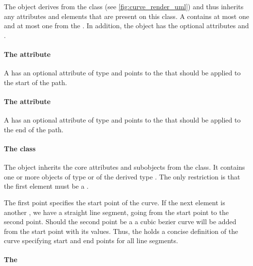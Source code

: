 The \RenderCurve object derives from the \GraphicalPrimitiveOneD class (see \ref{fig:curve_render_uml})
and thus inherits any attributes and elements that are present on this
class.
A \RenderCurve contains at most one \ListOfElements and at most one  from the \LayoutPackage.
In addition, the \RenderCurve object has the optional attributes  and .

\paragraph{The \fixttspace{} attribute}

A \RenderCurve has an optional attribute  of type
 and points to the \LineEnding that should be applied to the start of the path.

\paragraph{The \fixttspace{} attribute}

A \RenderCurve has an optional attribute  of type
 and points to the \LineEnding that should be applied to the end of the path.

\paragraph{The  class}
\label{listofelements-class}

The \ListOfElements object inherits
the core attributes and subobjects from the  class. It
contains one or more objects of type \RenderPoint or of the derived type \RenderCubicBezier. 
The only restriction is that the first element must be a \RenderPoint.

The first point specifies the start point of the curve. If the next element 
is another \RenderPoint, we have a straight line segment, going from the start point 
to the second point. Should the second point be a \RenderCubicBezier a cubic bezier curve 
will be added from the start point with its values. Thus, the \ListOfElements holds a concise
definition of the curve specifying start and end points for all line segments. 

\paragraph{The }

